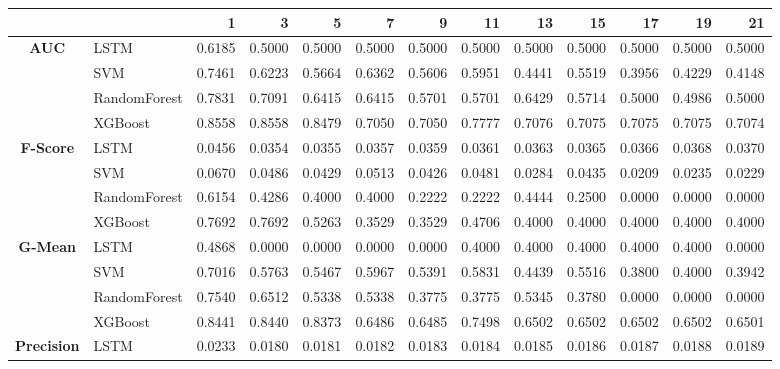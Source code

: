 \begin{table}[h]
	\centering
	\begin{adjustbox}{max width=15cm}
		\begin{tabular}{|c|l|r|r|r|r|r|r|r|r|r|r|r|}
			\hline
			&         &      1  &      3  &      5  &      7  &      9  &      11 &      13 &      15 &      17 &      19 &      21 \\
			\hline
			\textbf{AUC} & LSTM &  0.6185 &  0.5000 &  0.5000 &  0.5000 &  0.5000 &  0.5000 &  0.5000 &  0.5000 &  0.5000 &  0.5000 &  0.5000 \\
			& SVM &  0.7461 &  0.6223 &  0.5664 &  0.6362 &  0.5606 &  0.5951 &  0.4441 &  0.5519 &  0.3956 &  0.4229 &  0.4148 \\
			& RandomForest &  0.7831 &  0.7091 &  0.6415 &  0.6415 &  0.5701 &  0.5701 &  0.6429 &  0.5714 &  0.5000 &  0.4986 &  0.5000 \\
			& XGBoost &  0.8558 &  0.8558 &  0.8479 &  0.7050 &  0.7050 &  0.7777 &  0.7076 &  0.7075 &  0.7075 &  0.7075 &  0.7074 \\
			\hline
			\textbf{F-Score} & LSTM &  0.0456 &  0.0354 &  0.0355 &  0.0357 &  0.0359 &  0.0361 &  0.0363 &  0.0365 &  0.0366 &  0.0368 &  0.0370 \\
			& SVM &  0.0670 &  0.0486 &  0.0429 &  0.0513 &  0.0426 &  0.0481 &  0.0284 &  0.0435 &  0.0209 &  0.0235 &  0.0229 \\
			& RandomForest &  0.6154 &  0.4286 &  0.4000 &  0.4000 &  0.2222 &  0.2222 &  0.4444 &  0.2500 &  0.0000 &  0.0000 &  0.0000 \\
			& XGBoost &  0.7692 &  0.7692 &  0.5263 &  0.3529 &  0.3529 &  0.4706 &  0.4000 &  0.4000 &  0.4000 &  0.4000 &  0.4000 \\
			\hline
			\textbf{G-Mean} & LSTM &  0.4868 &  0.0000 &  0.0000 &  0.0000 &  0.0000 &  0.4000 &  0.4000 &  0.4000 &  0.4000 &  0.4000 & 0.0000 \\
			& SVM &  0.7016 &  0.5763 &  0.5467 &  0.5967 &  0.5391 &  0.5831 &  0.4439 &  0.5516 &  0.3800 &  0.4000 &  0.3942 \\
			& RandomForest &  0.7540 &  0.6512 &  0.5338 &  0.5338 &  0.3775 &  0.3775 &  0.5345 &  0.3780 &  0.0000 &  0.0000 &  0.0000 \\
			& XGBoost &  0.8441 &  0.8440 &  0.8373 &  0.6486 &  0.6485 &  0.7498 &  0.6502 &  0.6502 &  0.6502 &  0.6502 &  0.6501 \\
			\hline
			\textbf{Precision} & LSTM &  0.0233 &  0.0180 &  0.0181 &  0.0182 &  0.0183 &  0.0184 &  0.0185 &  0.0186 &  0.0187 &  0.0188 &  0.0189 \\

\end{tabular}
\end{adjustbox}
\end{table}

